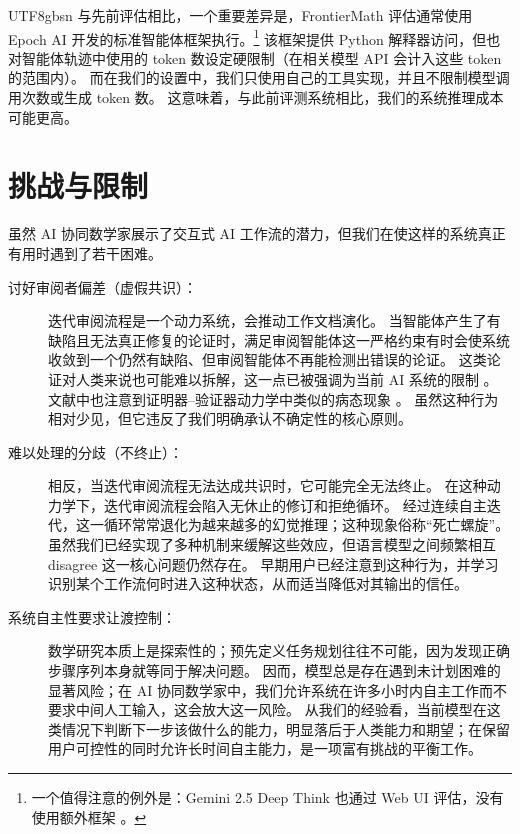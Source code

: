 \documentclass[11pt, a4paper, copyright, gdm]{google}
\begin{document}
\begin{CJK*}{UTF8}{gbsn}
与先前评估相比，一个重要差异是，FrontierMath 评估通常使用 Epoch AI 开发的标准智能体框架执行。\footnote{一个值得注意的例外是：Gemini 2.5 Deep Think 也通过 Web UI 评估，没有使用额外框架 \citep{epoch2025evaluatingdeepthink}。}
该框架提供 Python 解释器访问，但也对智能体轨迹中使用的 token 数设定硬限制（在相关模型 API 会计入这些 token 的范围内）。
而在我们的设置中，我们只使用自己的工具实现，并且不限制模型调用次数或生成 token 数。
这意味着，与此前评测系统相比，我们的系统推理成本可能更高。

\section{挑战与限制}
\label{sec:limitations}

虽然 AI 协同数学家展示了交互式 AI 工作流的潜力，但我们在使这样的系统真正有用时遇到了若干困难。

\begin{description}
%
%

    \item [讨好审阅者偏差（虚假共识）：] 迭代审阅流程是一个动力系统，会推动工作文档演化。
    当智能体产生了有缺陷且无法真正修复的论证时，满足审阅智能体这一严格约束有时会使系统收敛到一个仍然有缺陷、但审阅智能体不再能检测出错误的论证。
    这类论证对人类来说也可能难以拆解，这一点已被强调为当前 AI 系统的限制 \citep{kontorovich2025shapemathcome}。
    文献中也注意到证明器--验证器动力学中类似的病态现象 \citep{dang2026escapingcognitivewellefficient}。
    虽然这种行为相对少见，但它违反了我们明确承认不确定性的核心原则。
    
    \item[难以处理的分歧（不终止）：] 相反，当迭代审阅流程无法达成共识时，它可能完全无法终止。
    在这种动力学下，迭代审阅流程会陷入无休止的修订和拒绝循环。
    经过连续自主迭代，这一循环常常退化为越来越多的幻觉推理；这种现象俗称“死亡螺旋”。
    虽然我们已经实现了多种机制来缓解这些效应，但语言模型之间频繁相互 disagree 这一核心问题仍然存在。
    早期用户已经注意到这种行为，并学习识别某个工作流何时进入这种状态，从而适当降低对其输出的信任。

    \item[系统自主性要求让渡控制：] 数学研究本质上是探索性的；预先定义任务规划往往不可能，因为发现正确步骤序列本身就等同于解决问题。
    因而，模型总是存在遇到未计划困难的显著风险；在 AI 协同数学家中，我们允许系统在许多小时内自主工作而不要求中间人工输入，这会放大这一风险。
    从我们的经验看，当前模型在这类情况下判断下一步该做什么的能力，明显落后于人类能力和期望；在保留用户可控性的同时允许长时间自主能力，是一项富有挑战的平衡工作。


\end{description}
\end{CJK*}
\end{document}
